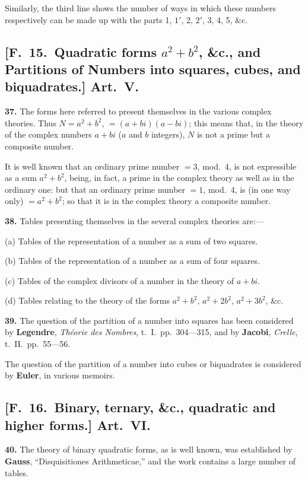 \documentclass[11pt,a4paper]{article}
\begin{document}
Similarly, the third line shows the number of ways in which these numbers respectively
can be made up with the parts 1, $1'$, 2, $2'$, 3, 4, 5, \&c.

\newpage
\subsection*{[F.\ 15.\ Quadratic forms $a^{2} + b^{2}$, \&c., and Partitions of Numbers into squares, cubes, and biquadrates.] Art.\ V.}

\textbf{37.} The forms here referred to present themselves in the various complex theories.
Thus $N = a^{2} + b^{2}$, $= (a+bi)(a-bi)$; this means that, in the theory of the complex
numbers $a + bi$ ($a$ and $b$ integers), $N$ is not a prime but a composite number.

It is well known that an ordinary prime number $= 3$, mod.\ 4, is not expressible as a sum
$a^{2} + b^{2}$, being, in fact, a prime in the complex theory as well as in the ordinary one:
but that an ordinary prime number $= 1$, mod.\ 4, is (in one way only) $= a^{2} + b^{2}$;
so that it is in the complex theory a composite number.

\textbf{38.} Tables presenting themselves in the several complex theories are:---

\quad(a) Tables of the representation of a number as a sum of two squares.

\quad(b) Tables of the representation of a number as a sum of four squares.

\quad(c) Tables of the complex divisors of a number in the theory of $a + bi$.

\quad(d) Tables relating to the theory of the forms $a^{2} + b^{2}$, $a^{2} + 2b^{2}$, $a^{2} + 3b^{2}$, \&c.

\textbf{39.} The question of the partition of a number into squares has been considered by
\quad\textbf{Legendre}, \textit{Th\' eorie des Nombres}, t.\ I.\ pp.\ 304---315,
and by
\quad\textbf{Jacobi}, \textit{Crelle}, t.\ II.\ pp.\ 55---56.

The question of the partition of a number into cubes or biquadrates is considered by
\quad\textbf{Euler}, in various memoirs.


\newpage
\subsection*{[F.\ 16.\ Binary, ternary, \&c., quadratic and higher forms.] Art.\ VI.}

\textbf{40.} The theory of binary quadratic forms, as is well known, was established by
\quad\textbf{Gauss}, ``Disquisitiones Arithmeticae,'' and the work contains a large number of tables.
\end{document}
